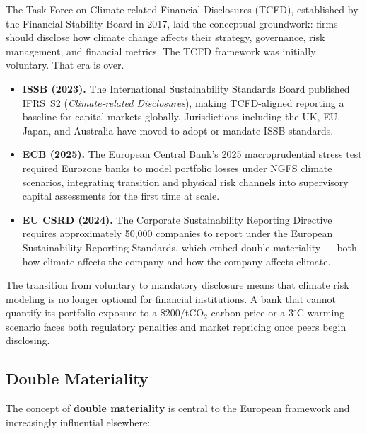 \documentclass[11pt, a4paper]{article}
\theoremstyle{definition}
\theoremstyle{plain}
\theoremstyle{remark}
\begin{document}
The Task Force on Climate-related Financial Disclosures (TCFD), established by the
Financial Stability Board in 2017, laid the conceptual groundwork: firms should
disclose how climate change affects their strategy, governance, risk management, and
financial metrics.
The TCFD framework was initially voluntary.
That era is over.

\begin{itemize}
    \item \textbf{ISSB (2023).} The International Sustainability Standards Board
          published IFRS~S2 (\emph{Climate-related Disclosures}), making
          TCFD-aligned reporting a baseline for capital markets globally.
          Jurisdictions including the UK, EU, Japan, and Australia have moved to
          adopt or mandate ISSB standards.
    \item \textbf{ECB (2025).} The European Central Bank's 2025 macroprudential
          stress test required Eurozone banks to model portfolio losses under
          NGFS climate scenarios, integrating transition and physical risk channels
          into supervisory capital assessments for the first time at scale.
    \item \textbf{EU CSRD (2024).} The Corporate Sustainability Reporting Directive
          requires approximately 50{,}000 companies to report under the European
          Sustainability Reporting Standards, which embed double materiality ---
          both how climate affects the company and how the company affects climate.
\end{itemize}

\begin{warningbox}
The transition from voluntary to mandatory disclosure means that climate risk
modeling is no longer optional for financial institutions.
A bank that cannot quantify its portfolio exposure to a \$200/tCO$_2$ carbon price
or a 3$^\circ$C warming scenario faces both regulatory penalties and market
repricing once peers begin disclosing.
\end{warningbox}

\subsection{Double Materiality}

The concept of \textbf{double materiality} is central to the European framework
and increasingly influential elsewhere:
\end{document}
